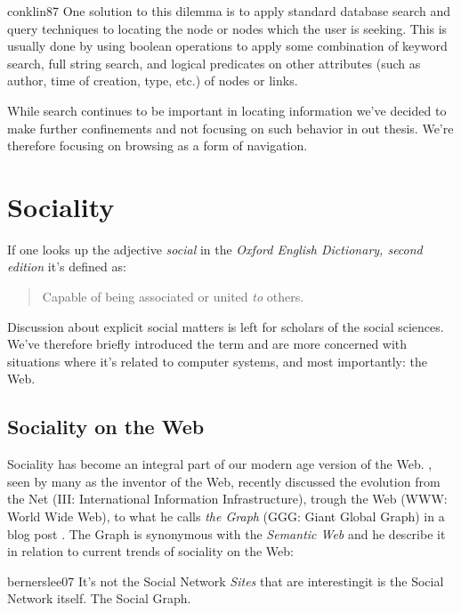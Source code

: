 \begin{citequote}[p.~38]{conklin87}
  One solution to this dilemma is to apply standard data\-base search and
  query techniques to locating the node or nodes which the user is seeking.
  This is usually done by using boolean operations to apply some combination
  of keyword search, full string search, and logical predicates on other
  attributes (such as author, time of creation, type, etc.) of nodes or links.
\end{citequote}

While search continues to be important in locating information we've decided
to make further confinements and not focusing on such behavior in out thesis.
We're therefore focusing on browsing as a form of navigation.

\section{Sociality}

If one looks up the adjective \emph{social} in the
\emph{Oxford English Dictionary, second edition} \citep[p.~905]{simpson89}
it's defined as:

\begin{quote}
  Capable of being associated or united \emph{to} others.
\end{quote}

Discussion about explicit social matters is left for scholars of the social
sciences. We've therefore briefly introduced the term and are more concerned
with situations where it's related to computer systems, and most importantly:
the Web.

\subsection{Sociality on the Web}

Sociality has become an integral part of our modern age version of the Web.
\citeauthor{bernerslee07}, seen by many as the inventor of the Web,
recently discussed the evolution from the Net (III: International
Information Infrastructure), trough the Web (WWW: World Wide Web),
to what he calls \emph{the Graph} (GGG: Giant Global Graph) in a
blog post \citeyearpar{bernerslee07}. The Graph is synonymous with the
\emph{Semantic Web}%
and he describe it in relation to
current trends of sociality on the Web:
\begin{citequote}{bernerslee07}
  It's not the Social Network \emph{Sites} that are interesting\dash{}it is
  the Social Network itself. The Social Graph.
\end{citequote}

